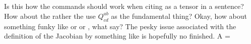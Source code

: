\documentclass{article}
\begin{document}
\\
 
\\
\\
\\
Is this how the commands should work when citing
 as a tensor in a sentence?  How about the
rather the use ${Q}^{ab}_{cd}$ as the fundamental thing? Okay, how
about something funky like  or
 or , what say? The
pesky issue associated with the definition of the Jacobian by
something like \idx{\Lambda}{\up{\gha}\dn{\ga}} is hopefully no
finished.
\be
A = \idx{\Lambda}{\up{\gha}\dn{\ga}}
\ee
\end{document}
